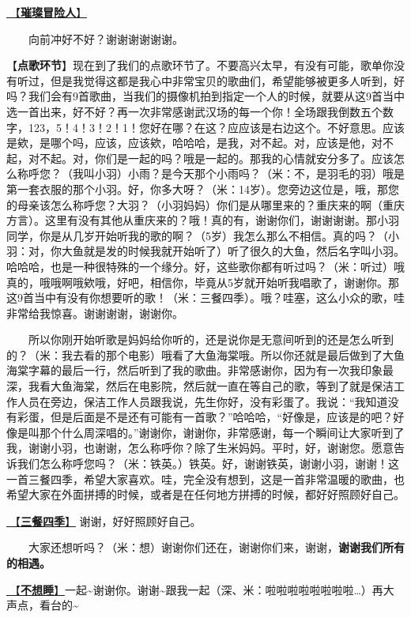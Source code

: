 \documentclass[]{ctexbook}
\begin{document}
\hyperref[adventurers]{🎵【\textbf{璀璨冒险人}】}

  向前冲好不好？谢谢谢谢谢谢。

【\textbf{点歌环节}】现在到了我们的点歌环节了。不要高兴太早，有没有可能，歌单你没有听过，但是我觉得这都是我心中非常宝贝的歌曲们，希望能够被更多人听到，好吗？我们会有9首歌曲，当我们的摄像机拍到指定一个人的时候，就要从这9首当中选一首出来，好不好？再一次非常感谢武汉场的每一个你！全场跟我倒数五个数字，123，5！4！3！2！1！您好在哪？在这？应应该是右边这个。不好意思。应该是欸，是哪个吗，应该，应该欸，哈哈哈，是我，对不起。对，应该是他，对不起，对不起。对，你们是一起的吗？哦是一起的。那我的心情就安分多了。应该怎么称呼您？（我叫小羽）小雨？是今天那个小雨吗？（米：不，是羽毛的羽）哦是第一套衣服的那个小羽。好，你多大呀？（米：14岁）。您旁边这位是，哦，那您的母亲该怎么称呼您？大羽？（小羽妈妈）你们是从哪里来的？重庆来的啊（重庆方言）。这里有没有其他从重庆来的？哦！真的有，谢谢你们，谢谢谢谢。那小羽同学，你是从几岁开始听我的歌的啊？（5岁）我怎么那么不相信。真的吗？（小羽：对，你大鱼就是发的时候我就开始听了）听了很久的大鱼，然后名字叫小羽。哈哈哈，也是一种很特殊的一个缘分。好，这些歌你都有听过吗？（米：听过）哦真的，哦哦啊哦欸哦，好吧，相信你，毕竟从5岁就开始听我唱歌了，谢谢你。那这9首当中有没有你想要听的歌！（米：三餐四季）。哦？哇塞，这么小众的歌，哇非常给我惊喜。谢谢谢谢，谢谢你。

  所以你刚开始听歌是妈妈给你听的，还是说你是无意间听到的还是怎么听到的？（米：我去看的那个电影）哦看了大鱼海棠哦。所以你还就是最后做到了大鱼海棠字幕的最后一行，然后听到了我的歌曲。非常感谢你，因为有一次我印象最深，我看大鱼海棠，然后在电影院，然后就一直在等自己的歌，等到了就是保洁工作人员在旁边，保洁工作人员跟我说，先生你好，没有彩蛋了。我说：``我知道没有彩蛋，但是后面是不是还有可能有一首歌？''哈哈哈，``好像是，应该是的吧？好像是叫那个什么周深唱的。''谢谢你，谢谢你，非常感谢，每一个瞬间让大家听到了我，谢谢小羽，也谢谢，怎么称呼你？除了生米妈妈。平时，好，谢谢您。愿意告诉我们怎么称呼您吗？（米：铁英。）铁英。好，谢谢铁英，谢谢小羽，谢谢！这一首三餐四季，希望大家喜欢。哇，完全没有想到，这是一首非常温暖的歌曲，也希望大家在外面拼搏的时候，或者是在任何地方拼搏的时候，都好好照顾好自己。

\hyperref[three-meals-a-day]{🎵【\textbf{三餐四季}】} 谢谢，好好照顾好自己。

  大家还想听吗？（米：想）谢谢你们还在，谢谢你们来，谢谢，\textbf{谢谢我们所有的相遇。}

\hyperref[keep-playing]{🎵【\textbf{不想睡}】}一起\textasciitilde 谢谢你。谢谢\textasciitilde 跟我一起（深、米：啦啦啦啦啦啦啦啦\ldots）再大声点，看台的\textasciitilde{}
\end{document}
